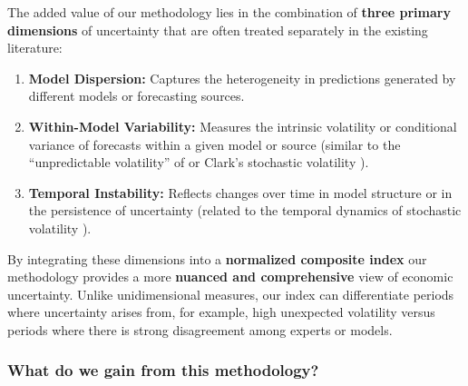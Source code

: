 \documentclass[5p,authoryear]{elsarticle}
\begin{document}
The added value of our methodology lies in the combination of \textbf{three primary dimensions} of uncertainty that are often treated separately in the existing literature:
\begin{enumerate}
    \item \textbf{Model Dispersion:} Captures the heterogeneity in predictions generated by different models or forecasting sources.
    \item \textbf{Within-Model Variability:} Measures the intrinsic volatility or conditional variance of forecasts within a given model or source (similar to the ``unpredictable volatility'' of \cite{jurado2015} or Clark's stochastic volatility \cite{clark2017}).
    \item \textbf{Temporal Instability:} Reflects changes over time in model structure or in the persistence of uncertainty (related to the temporal dynamics of stochastic volatility \cite{clark2017}).
\end{enumerate}

By integrating these dimensions into a \textbf{normalized composite index} our methodology provides a more \textbf{nuanced and comprehensive} view of economic uncertainty. Unlike unidimensional measures, our index can differentiate periods where uncertainty arises from, for example, high unexpected volatility versus periods where there is strong disagreement among experts or models.

\subsubsection*{What do we gain from this methodology?}
\end{document}
